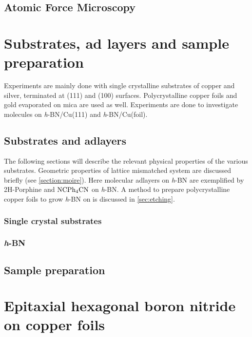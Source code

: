 \documentclass[
twoside,				%
BCOR=12mm,				%
headings=normal,		%
headsepline,			%
footsepline,			%
plainfootsepline,		%
]{scrbook}
\begin{document}
  \section{\textbf{A}tomic \textbf{F}orce \textbf{M}icroscopy}
  \label{section:afm}
	

\chapter{Substrates, ad layers and sample preparation}
 Experiments are mainly done with single crystalline substrates of copper and silver, terminated at (111) and (100) surfaces. Polycrystalline copper foils and gold evaporated on mica are used as well. Experiments are done to investigate molecules on \textit{h}-BN/Cu(111) and \textit{h}-BN/Cu(foil).
 
  \section{Substrates and adlayers}
The following sections will describe the relevant physical properties of the various substrates. Geometric properties of lattice mismatched system are discussed briefly (see \autoref{section:moire}). Here molecular adlayers on \textit{h}-BN are exemplified by 2H-Porphine and $\textnormal{NC}\textnormal{Ph}_4\textnormal{CN}$ on \textit{h}-BN. A method to prepare polycrystalline copper foils to grow \textit{h}-BN on is discussed in \autoref{sec:etching}. 

     \subsection{Single crystal substrates}
        

     \subsection{\textit{h}-BN}
		

  \section{Sample preparation}
    

\chapter{Epitaxial hexagonal boron nitride on copper foils}
%

\end{document}
